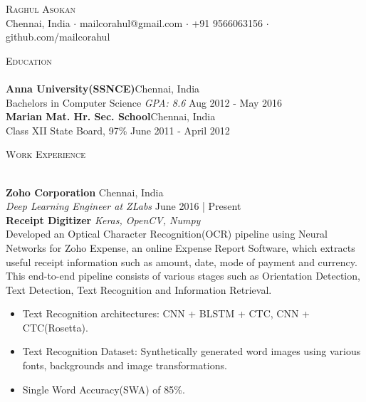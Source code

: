\documentclass[a4paper]{article}
\newcommand{\lineunder} {
    \vspace*{-8pt} \\
    \hspace*{-18pt} \hrulefill \\
}
\newcommand{\header} [1] {
    {\hspace*{-18pt}\vspace*{6pt} \textsc{#1}}
    \vspace*{-6pt} \lineunder
}
\begin{document}
\vspace*{-40pt}

    

\vspace*{-10pt}
\begin{center}
	{\Huge \scshape {Raghul Asokan}}\\
	Chennai, India $\cdot$ mailcorahul@gmail.com $\cdot$ +91 9566063156 $\cdot$ github.com/mailcorahul\\
\end{center}

\header{Education}
\textbf{Anna University(SSNCE)}\hfill Chennai, India\\
Bachelor\textquotesingle{}s in Computer Science \textit{GPA: 8.6} \hfill Aug 2012 - May 2016\\
\vspace{2mm}
\textbf{Marian Mat. Hr. Sec. School}\hfill Chennai, India\\
Class XII State Board, 97\% \hfill June 2011 - April 2012\\
\vspace{2mm}

\header{Work Experience}
\vspace{1mm}

\textbf{Zoho Corporation} \hfill Chennai, India\\
\textit{Deep Learning Engineer at ZLabs} \hfill June 2016 | Present\\
\vspace*{2mm}
{\textbf{Receipt Digitizer}} {\sl Keras, OpenCV, Numpy} \\
Developed an Optical Character Recognition(OCR) pipeline using Neural Networks for Zoho Expense, an online Expense Report Software, which extracts useful receipt information such as amount, date, mode of payment and currency. This end-to-end pipeline consists of various stages such as Orientation Detection, Text Detection, Text Recognition and Information Retrieval.\\            
            \begin{itemize}
                \itemsep-0.5em
                \item Text Recognition architectures: CNN + BLSTM + CTC, CNN + CTC(Rosetta).
                \item Text Recognition Dataset: Synthetically generated word images using various fonts, backgrounds and image transformations.
                \item Single Word Accuracy(SWA) of 85\%.
            \end{itemize}
\end{document}
